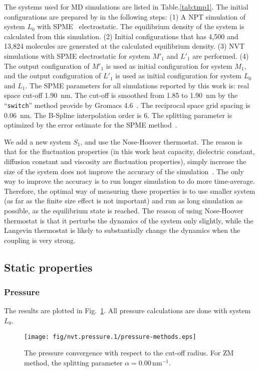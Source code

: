\documentclass[aip,jcp,a4paper,preprint,unsortedaddress,onecolumn,fleqn]{revtex4-1}
\newcommand{\systemsb}{S_1}
\newcommand{\systemmb}{M_1}
\newcommand{\systemmbp}{M'_1}
\newcommand{\systemla}{L_0}
\newcommand{\systemlbp}{L'_1}
\newcommand{\systemlb}{L_1}
\begin{document}
The systems used for MD simulations are listed in
Table.\ref{tab:tmp1}.  The initial configurations are prepared by in
the following steps: (1) A NPT simulation of system $\systemla$ with SPME~\cite{darden1993pme, essmann1995spm}
electrostatic. The equilibrium density of the system is calculated
from this simulation. (2) Initial configurations that has 4,500 and
13,824 molecules are generated at the calculated equilibrium
density. (3) NVT simulations with SPME electrostatic for system $\systemmbp$
and $\systemlbp$ are performed. (4) The output configuration of $\systemmbp$ is used as
initial configuration for system $\systemmb$, and the output configuration of
$\systemlbp$ is used as initial configuration for system $\systemla$ and $\systemlb$.  The SPME
parameters for all simulations reported by this work is: real space
cut-off 1.90~nm. The cut-off is smoothed from 1.85 to 1.90~nm by the
``\texttt{switch}'' method provide by Gromacs
4.6~\cite{hess2008gromacs, pronk2013gromacs}. The reciprocal space
grid spacing is 0.06~nm. The B-Spline interpolation order is 6. The
splitting parameter is optimized by the error estimate for the SPME method~\cite{wang2010optimizing}.

We add a new system $\systemsb$, and use the Nose-Hoover
thermostat. The reason is that for the fluctuation properties (in this
work heat capacity, dielectric constant, diffusion constant and
viscosity are fluctuation properties), simply increase the size of the
system does not improve the accuracy of the
simulation~\cite{ferrenberg1991statistical}. The only way to improve
the accuracy is to run longer simulation to do more
time-average. Therefore, the optimal way of measuring these properties
is to use smaller system (as far as the finite size effect is not
important) and run as long simulation as possible, as the equilibrium
state is reached. The reason of using Nose-Hoover thermostat is that
it perturbs the dynamics of the system only slightly, while the
Langevin thermostat is likely to substantially change the dynamics
when the coupling is very strong.

\subsection{Static properties}

\subsubsection{Pressure}
The results are plotted in Fig.~\ref{fig:tmp0}. All pressure calculations are done with system $\systemla$.
\begin{figure}
  \centering
  \texttt{[image: fig/nvt.pressure.1/pressure-methods.eps]}
  \caption{The pressure convergence with respect to the cut-off radius.
    For ZM method, the splitting parameter $\alpha = 0.00\,\textrm{nm}^{-1}$.
  }
  \label{fig:tmp0}
\end{figure}
\end{document}
